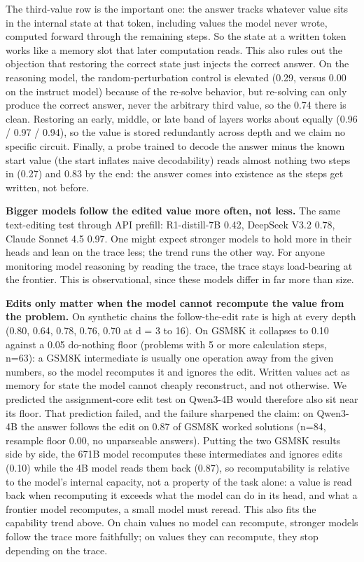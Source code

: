 The third-value row is the important one: the answer tracks whatever
value sits in the internal state at that token, including values the
model never wrote, computed forward through the remaining steps. So the
state at a written token works like a memory slot that later computation
reads. This also rules out the objection that restoring the correct
state just injects the correct answer. On the reasoning model, the
random-perturbation control is elevated (0.29, versus 0.00 on the
instruct model) because of the re-solve behavior, but re-solving can
only produce the correct answer, never the arbitrary third value, so the
0.74 there is clean. Restoring an early, middle, or late band of layers
works about equally (0.96 / 0.97 / 0.94), so the value is stored
redundantly across depth and we claim no specific circuit. Finally, a
probe trained to decode the answer minus the known start value (the
start inflates naive decodability) reads almost nothing two steps in
(0.27) and 0.83 by the end: the answer comes into existence as the steps
get written, not before.

\textbf{Bigger models follow the edited value more often, not less.} The
same text-editing test through API prefill: R1-distill-7B 0.42, DeepSeek
V3.2 0.78, Claude Sonnet 4.5 0.97. One might expect stronger models to
hold more in their heads and lean on the trace less; the trend runs the
other way. For anyone monitoring model reasoning by reading the trace,
the trace stays load-bearing at the frontier. This is observational,
since these models differ in far more than size.

\textbf{Edits only matter when the model cannot recompute the value from
the problem.} On synthetic chains the follow-the-edit rate is high at
every depth (0.80, 0.64, 0.78, 0.76, 0.70 at d = 3 to 16). On GSM8K it
collapses to 0.10 against a 0.05 do-nothing floor (problems with 5 or
more calculation steps, n=63): a GSM8K intermediate is usually one
operation away from the given numbers, so the model recomputes it and
ignores the edit. Written values act as memory for state the model
cannot cheaply reconstruct, and not otherwise. We predicted the
assignment-core edit test on Qwen3-4B would therefore also sit near its
floor. That prediction failed, and the failure sharpened the claim: on
Qwen3-4B the answer follows the edit on 0.87 of GSM8K worked solutions
(n=84, resample floor 0.00, no unparseable answers). Putting the two
GSM8K results side by side, the 671B model recomputes these
intermediates and ignores edits (0.10) while the 4B model reads them
back (0.87), so recomputability is relative to the model's internal
capacity, not a property of the task alone: a value is read back when
recomputing it exceeds what the model can do in its head, and what a
frontier model recomputes, a small model must reread. This also fits the
capability trend above. On chain values no model can recompute, stronger
models follow the trace more faithfully; on values they can recompute,
they stop depending on the trace.

